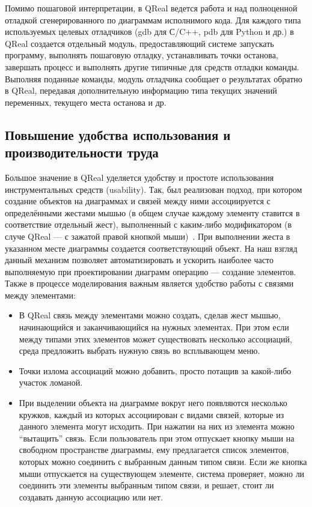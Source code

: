 \documentclass[a4paper]{article}
\begin{document}
Помимо пошаговой интерпретации, в QReal ведется работа и над полноценной отладкой сгенерированного по диаграммам исполнимого кода. Для каждого типа используемых целевых отладчиков (gdb для С/C++, pdb для Python и др.) в QReal создается отдельный модуль, предоставляющий системе запускать программу, выполнять пошаговую отладку, устанавливать точки останова, завершать процесс и выполнять другие типичные для средств отладки команды. Выполняя поданные команды, модуль отладчика сообщает о результатах обратно в QReal, передавая дополнительную информацию типа текущих значений переменных, текущего места останова и др. 
  
\subsection*{Повышение удобства использования и производительности труда}

Большое значение в QReal уделяется удобству и простоте использования инструментальных средств (usability). Так, был реализован подход, при котором создание объектов на диаграммах и связей между ними ассоциируется с определёнными жестами мышью (в общем случае каждому элементу ставится в соответствие отдельный жест), выполненный с каким-либо модификатором (в случе QReal --- с зажатой правой кнопкой мыши)~\cite{mousegestures}. При выполнении жеста в указанном месте диаграммы создается соответствующий объект. На наш взгляд данный механизм позволяет автоматизировать и ускорить наиболее часто выполняемую при проектировании диаграмм операцию --- создание элементов. Также в процессе моделирования важным является удобство работы с связями между элементами:
\begin{itemize} 
  \item В QReal связь между элементами можно создать, сделав жест мышью, начинающийся и заканчивающийся на нужных элементах. При этом если между типами этих элементов может существовать несколько ассоциаций, среда предложить выбрать нужную связь во всплывающем меню. 
  \item Точки излома ассоциаций можно добавить, просто потащив за какой-либо участок ломаной. 
  \item При выделении объекта на диаграмме вокруг него появляются несколько кружков, каждый из которых ассоциирован с видами связей, которые из данного элемента могут исходить. При нажатии на них из элемента можно “вытащить” связь. Если пользователь при этом отпускает кнопку мыши на свободном пространстве диаграммы, ему предлагается список элементов, которых можно соединить с выбранным данным типом связи. Если же кнопка мыши отпускается на существующем элементе, система проверяет, можно ли соединить эти элементы выбранным типом связи, и решает, стоит ли создавать данную ассоциацию или нет. 
\end{itemize}
\end{document}
